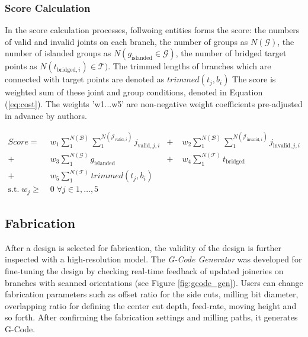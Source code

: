 \subsubsection*{Score Calculation}
In the score calculation processes, follwoing entities forms the score: the numbers of valid and invalid joints on each branch, the number of groups as $N(\mathcal{G} )$, the number of islanded groups as $N(g_{\text{islanded}} \in \mathcal{G} )$, the number of bridged target points as $N(t_{\text{bridged}, i}) \in \mathcal{T} )$.
The trimmed lengths of branches which are connected with target points are denoted as $trimmed(t_j, b_i)$
The score is weighted sum of these joint and group conditions, denoted in Equation (\ref{eq:cost}).
The weights 'w1...w5' are non-negative weight coefficients pre-adjusted in advance by authors.




\begin{equation} \label{eq:cost}
 \begin{aligned}
 Score =  &\; w_1  \sum_{1}^{N(\mathcal{B})} \sum_{1}^{N(\mathcal{J}_{\text{valid},i})} j_{\text{valid}, j, i} 
	& + \; &w_2  \sum_{1}^{N(\mathcal{B})} \sum_{1}^{N(\mathcal{J}_{\text{invalid},i})} j_{\text{invalid}, j, i}\\
+ &\; w_3  \sum_{1}^{N(\mathcal{G})} g_{\text{islanded}} \;
	& + \; &w_4  \sum_{1}^{N(\mathcal{T})} t_{\text{bridged}} \; \\
+ &\; w_5 \sum_{1}^{N(\mathcal{T})} trimmed(t_j, b_i)
 \\
   \textrm{s.t.} \; w_j  \geq  &\;0 \; \forall j \in 1, \dotsc , 5 
 \end{aligned}
\end{equation}

\subsection{Fabrication}
After a design is selected for fabrication, the validity of the design is further inspected with a high-resolution model.
The \textit{G-Code Generator} was developed for fine-tuning the design by checking real-time feedback of updated joineries on branches with scanned orientations (see Figure \ref{fig:gcode_gen}).
Users can change fabrication parameters such as offset ratio for the side cuts, milling bit diameter, overlapping ratio for defining the center cut depth, feed-rate, moving height and so forth.
After confirming the fabrication settings and milling paths, it generates G-Code.

